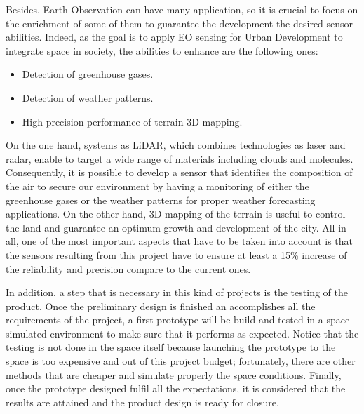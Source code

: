 Besides, Earth Observation can have many application, so it is crucial to focus on the enrichment of some of them to guarantee the development the desired sensor abilities. Indeed, as the goal is to apply EO sensing for Urban Development to integrate space in society, the abilities to enhance are the following ones:
\begin{itemize}
	\item Detection of greenhouse gases. 
	\item Detection of weather patterns.
	\item High precision performance of terrain 3D mapping. 
\end{itemize} 
On the one hand, systems as LiDAR, which combines technologies as laser and radar, enable to target a wide range of materials including clouds and molecules. Consequently, it is possible to develop a sensor that identifies the composition of the air to secure our environment by having a monitoring of either the greenhouse gases or the weather patterns for proper weather forecasting applications. On the other hand, 3D mapping of the terrain is useful to control the land and guarantee an optimum growth and development of the city. All in all, one of the most important aspects that have to be taken into account is that the sensors resulting from this project have to ensure at least a 15\% increase of the reliability and precision compare to the current ones.  

In addition, a step that is necessary in this kind of projects is the testing of the product. Once the preliminary design is finished an accomplishes all the requirements of the project, a first prototype will be build and tested in a space simulated environment to make sure that it performs as expected. Notice that the testing is not done in the space itself because launching the prototype to the space is too expensive and out of this project budget; fortunately, there are other methods that are cheaper and simulate properly the space conditions. Finally, once the prototype designed fulfil all the expectations, it is considered that the results are attained and the product design is ready for closure. 